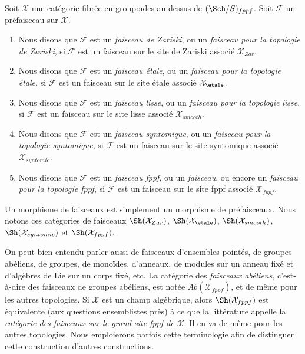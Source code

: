 \begin{definition}
\label{definition-sheaves}
Soit $\mathcal{X}$ une catégorie fibrée en groupoïdes au-dessus de
$(\Sch/S)_{fppf}$. Soit $\mathcal{F}$ un préfaisceau sur $\mathcal{X}$.
\begin{enumerate}
\item Nous disons que $\mathcal{F}$ est un {\it faisceau de Zariski}, ou un
{\it faisceau pour la topologie de Zariski}, si $\mathcal{F}$
est un faisceau sur le site de Zariski associé $\mathcal{X}_{Zar}$.
\item Nous disons que $\mathcal{F}$ est un {\it faisceau étale}, ou un
{\it faisceau pour la topologie étale}, si $\mathcal{F}$
est un faisceau sur le site étale associé $\mathcal{X}_\etale$.
\item Nous disons que $\mathcal{F}$ est un {\it faisceau lisse}, ou un
{\it faisceau pour la topologie lisse}, si $\mathcal{F}$
est un faisceau sur le site lisse associé $\mathcal{X}_{smooth}$.
\item Nous disons que $\mathcal{F}$ est un {\it faisceau syntomique}, ou un
{\it faisceau pour la topologie syntomique}, si $\mathcal{F}$
est un faisceau sur le site syntomique associé $\mathcal{X}_{syntomic}$.
\item Nous disons que $\mathcal{F}$ est un {\it faisceau fppf}, ou un {\it faisceau},
ou encore un {\it faisceau pour la topologie fppf}, si $\mathcal{F}$
est un faisceau sur le site fppf associé $\mathcal{X}_{fppf}$.
\end{enumerate}
Un morphisme de faisceaux est simplement un morphisme de préfaisceaux. Nous notons
ces catégories de faisceaux
$\Sh(\mathcal{X}_{Zar})$,
$\Sh(\mathcal{X}_\etale)$,
$\Sh(\mathcal{X}_{smooth})$,
$\Sh(\mathcal{X}_{syntomic})$ et
$\Sh(\mathcal{X}_{fppf})$.
\end{definition}

\noindent
On peut bien entendu parler aussi de faisceaux d'ensembles pointés, de groupes abéliens,
de groupes, de monoïdes, d'anneaux, de modules sur un anneau fixé et d'algèbres de Lie sur
un corps fixé, etc. La catégorie des {\it faisceaux abéliens}, c'est-à-dire des faisceaux
de groupes abéliens, est notée $\textit{Ab}(\mathcal{X}_{fppf})$,
et de même pour les autres topologies. Si $\mathcal{X}$ est un champ
algébrique, alors $\Sh(\mathcal{X}_{fppf})$ est équivalente (aux
questions ensemblistes près) à ce que la littérature appelle
la {\it catégorie des faisceaux sur le grand site fppf de $\mathcal{X}$}. Il en va de même
pour les autres topologies. Nous emploierons parfois cette terminologie afin de
distinguer cette construction d'autres constructions.

